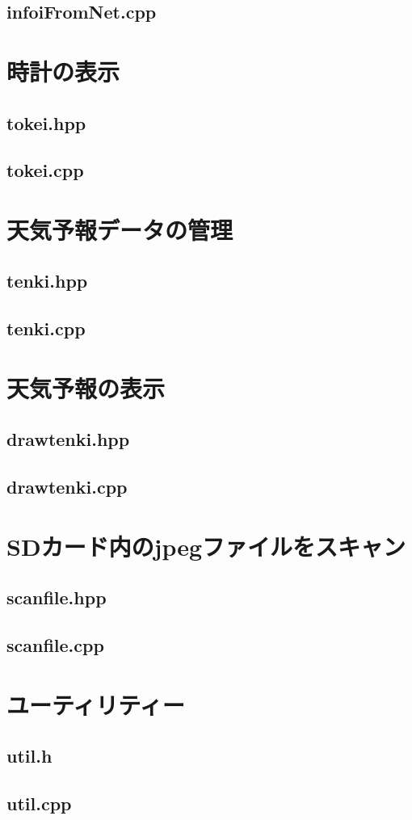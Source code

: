 \documentclass[a4paper, 10pt]{ltjsarticle}
\begin{document}
\subsection{infoiFromNet.cpp}

\clearpage

\section{時計の表示}
\subsection{tokei.hpp}

\subsection{tokei.cpp}

\clearpage

\section{天気予報データの管理}
\subsection{tenki.hpp}

\subsection{tenki.cpp}

\clearpage

\section{天気予報の表示}
\subsection{drawtenki.hpp}

\subsection{drawtenki.cpp}

\clearpage

\section{SDカード内のjpegファイルをスキャン}
\subsection{scanfile.hpp}

\subsection{scanfile.cpp}

\clearpage

\section{ユーティリティー}
\subsection{util.h}

\subsection{util.cpp}

\end{document}
